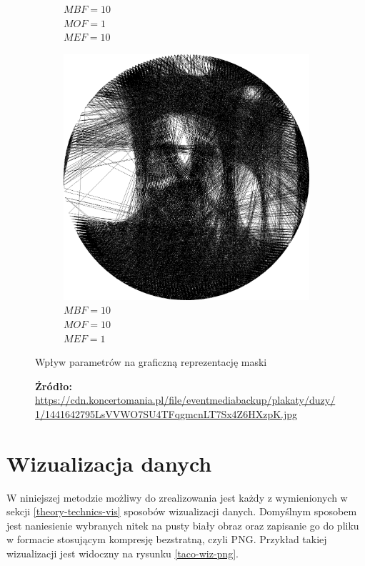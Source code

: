 \documentclass[a4paper, 12pt, polish, twoside]{extreport}
\begin{document}
\begin{figure}[H]
\begin{subfigure}{0.32\textwidth}
        \caption{\(MBF = 10\) \\ \(MOF = 1\) \\ \(MEF = 10\)}
        \label{mine-param-taco-thread-h}
    \end{subfigure}
    \begin{subfigure}{0.32\textwidth}
        \centering
        \includegraphics[width = \textwidth]{img/4-mine/taco-thread/taco_e_i3000_c20_inv0_bg10_obj10_ed1.png}
        \caption{\(MBF = 10\) \\ \(MOF = 10\) \\ \(MEF = 1\)}
        \label{mine-param-taco-thread-i}
    \end{subfigure}
    \caption{Wpływ parametrów na graficzną reprezentację maski}
    \caption*{\footnotesize{\textbf{Źródło:} {\url{https://cdn.koncertomania.pl/file/eventmediabackup/plakaty/duzy/1/1441642795LsVVWO7SU4TFqgmcnLT7Sx4Z6HXzpK.jpg}}}}
    \label{mine-param-taco-thread}
    \end{figure}
    \section{Wizualizacja danych}
    W niniejszej metodzie możliwy do zrealizowania jest każdy z wymienionych w sekcji \ref{theory-technics-vis} sposobów wizualizacji danych. Domyślnym sposobem jest naniesienie wybranych nitek na pusty biały obraz oraz zapisanie go do pliku w formacie stosującym kompresję bezstratną, czyli PNG. Przykład takiej wizualizacji jest widoczny na rysunku \ref{taco-wiz-png}.
    
\end{document}
